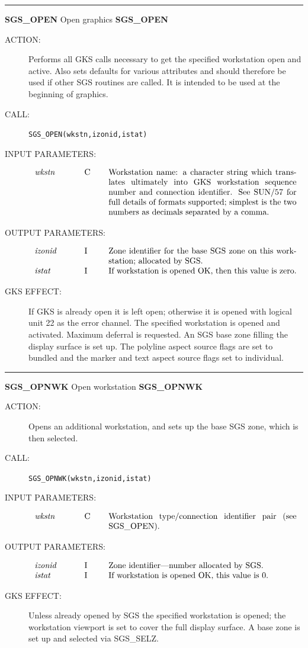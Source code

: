 \documentclass[11pt]{article}
\newcommand{\htmlref}[2]{#1}
\newcommand{\xref}[3]{#1}
\newcommand{\xlabel}[1]{}
\newcommand{\rthead}[2]{\rule{\textwidth}{0.3mm}
{\Large {\bf #1} \hfill #2 \hfill {\bf #1}}}
\newenvironment{params}%
{\[\begin{tabular}{p{0.14\textwidth}p{0.05\textwidth}p{0.66\textwidth}}}%
{\end{tabular}\]}
\newcommand{\rparams}[3]{{\em #1} &#2 &#3\\}
\newcommand{\rthead}[2]{\subsection{\label{#1}\xlabel{#1}#1 - #2}}
\newenvironment{params}{\begin{description}}{\end{description}}
\newcommand{\rparams}[3]{\item{{\em #1}} (#2) #3}
\begin{document}
\rthead{SGS\_OPEN}{Open graphics}
\begin{description}
\item [ACTION:]
Performs all GKS calls necessary to get the specified workstation open and
active.
Also sets defaults for various attributes and should therefore be used if
other SGS routines are called.
It is intended to be used at the beginning of graphics.
\item [CALL:]
{\tt SGS\_OPEN(wkstn,izonid,istat)}
\item [INPUT PARAMETERS:]
\begin{params}
\rparams{wkstn}{C}{Workstation name: a character string which translates
ultimately into GKS workstation sequence number and connection identifier.
See \xref{SUN/57}{sun57}{}
for full details of formats supported; simplest is the two numbers
as decimals separated by a comma.}
\end{params}
\item [OUTPUT PARAMETERS:]
\begin{params}
\rparams{izonid}{I}{Zone identifier for the base SGS zone on this workstation;
allocated by SGS.}
\rparams{istat}{I}{If workstation is opened OK, then this value is zero.}
\end{params}
\item [GKS EFFECT:]
If GKS is already open it is left open; otherwise it is opened with logical
unit 22 as the error channel.
The specified workstation is opened and activated.
Maximum deferral is requested.
An SGS base zone filling the display surface is set up.
The polyline aspect source flags are set to bundled and the marker and text
aspect source flags set to individual.
\end{description}
\goodbreak

\rthead{SGS\_OPNWK}{Open workstation}
\begin{description}
\item [ACTION:]
Opens an additional workstation, and sets up the base SGS zone, which is then
selected.
\item [CALL:]
{\tt SGS\_OPNWK(wkstn,izonid,istat)}
\item [INPUT PARAMETERS:]
\begin{params}
\rparams{wkstn}{C}{Workstation type/connection identifier pair (see SGS\_OPEN).}
\end{params}
\item [OUTPUT PARAMETERS:]
\begin{params}
\rparams{izonid}{I}{Zone identifier---number allocated by SGS.}
\rparams{istat}{I}{If workstation is opened OK, this value is 0.}
\end{params}
\item [GKS EFFECT:]
Unless already opened by SGS the specified workstation is opened; the
workstation viewport is set to cover the full display surface.
A base zone is set up and selected via \htmlref{SGS\_SELZ}{SGS_SELZ}.
\end{description}
\goodbreak
\end{document}
